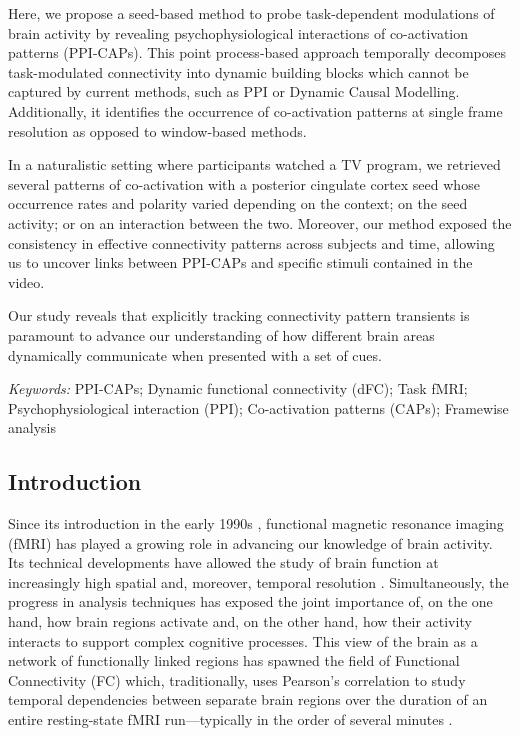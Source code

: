 Here, we propose a seed-based method to probe task-dependent modulations of brain activity by revealing psychophysiological interactions of co-activation patterns (PPI-CAPs). This point process-based approach temporally decomposes task-modulated connectivity into dynamic building blocks which cannot be captured by current methods, such as PPI or  Dynamic Causal Modelling. Additionally, it identifies the occurrence of co-activation patterns at single frame resolution as opposed to window-based methods. 

In a naturalistic setting where participants watched a TV program, we retrieved several patterns of co-activation with a posterior cingulate cortex seed whose occurrence rates and polarity varied depending on the context; on the seed activity; or on an interaction between the two. Moreover, our method exposed the consistency in effective connectivity patterns across subjects and time, allowing us to uncover links between PPI-CAPs and specific stimuli contained in the video. 

Our study reveals that explicitly tracking connectivity pattern transients is paramount to advance our understanding of how different brain areas dynamically communicate when presented with a set of cues.

\textit{Keywords:} PPI-CAPs; Dynamic functional connectivity (dFC); Task fMRI; Psychophysiological interaction (PPI); Co-activation patterns (CAPs); Framewise analysis 
 
\subsection{Introduction}

Since its introduction in the early 1990s \citep{Ogawa1990}, functional magnetic resonance imaging (fMRI) has played a growing role in advancing our knowledge of brain activity.  Its technical developments have allowed the study of brain function at increasingly high spatial and, moreover, temporal resolution \citep{VanEssen2013}. Simultaneously, the progress in analysis techniques has exposed the joint importance of, on the one hand, how brain regions activate and, on the other hand, how their activity interacts to support complex cognitive processes. This view of the brain as a network of functionally linked regions has spawned the field of Functional Connectivity (FC) which, traditionally, uses Pearson's correlation to study temporal dependencies between separate brain regions over the duration of an entire resting-state fMRI run---typically in the order of several minutes \citep{VandenHeuvel2010a}. 

